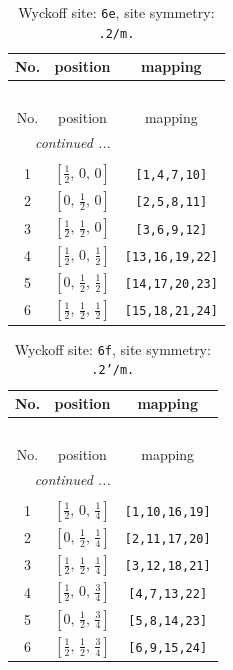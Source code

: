 \documentclass[fleqn,8pt]{jsarticle}
\begin{document}
\renewcommand{\arraystretch}{1.2}
\begin{longtable}{ccc}
\caption{Wyckoff site: {\tt 6e}, site symmetry: {\tt .2/m.}}
 \\
 \hline \hline
No. & position & mapping \\ \hline \endfirsthead

\multicolumn{2}{l}{\tablename\ \thetable{}} \\
 \hline \hline
No. & position & mapping \\ \hline \endhead

 \hline \hline
\multicolumn{2}{r}{\footnotesize\it continued ...} \\ \endfoot

 \hline \hline
\multicolumn{2}{r}{} \\ \endlastfoot

1 & $\left[ \frac{1}{2},\, 0,\, 0 \right]$ & {\tt [1,4,7,10]} \\ \hline
2 & $\left[ 0,\, \frac{1}{2},\, 0 \right]$ & {\tt [2,5,8,11]} \\ \hline
3 & $\left[ \frac{1}{2},\, \frac{1}{2},\, 0 \right]$ & {\tt [3,6,9,12]} \\ \hline
4 & $\left[ \frac{1}{2},\, 0,\, \frac{1}{2} \right]$ & {\tt [13,16,19,22]} \\ \hline
5 & $\left[ 0,\, \frac{1}{2},\, \frac{1}{2} \right]$ & {\tt [14,17,20,23]} \\ \hline
6 & $\left[ \frac{1}{2},\, \frac{1}{2},\, \frac{1}{2} \right]$ & {\tt [15,18,21,24]} \\
\end{longtable}
\renewcommand{\arraystretch}{1.2}
\begin{longtable}{ccc}
\caption{Wyckoff site: {\tt 6f}, site symmetry: {\tt .2'/m.}}
 \\
 \hline \hline
No. & position & mapping \\ \hline \endfirsthead

\multicolumn{2}{l}{\tablename\ \thetable{}} \\
 \hline \hline
No. & position & mapping \\ \hline \endhead

 \hline \hline
\multicolumn{2}{r}{\footnotesize\it continued ...} \\ \endfoot

 \hline \hline
\multicolumn{2}{r}{} \\ \endlastfoot

1 & $\left[ \frac{1}{2},\, 0,\, \frac{1}{4} \right]$ & {\tt [1,10,16,19]} \\ \hline
2 & $\left[ 0,\, \frac{1}{2},\, \frac{1}{4} \right]$ & {\tt [2,11,17,20]} \\ \hline
3 & $\left[ \frac{1}{2},\, \frac{1}{2},\, \frac{1}{4} \right]$ & {\tt [3,12,18,21]} \\ \hline
4 & $\left[ \frac{1}{2},\, 0,\, \frac{3}{4} \right]$ & {\tt [4,7,13,22]} \\ \hline
5 & $\left[ 0,\, \frac{1}{2},\, \frac{3}{4} \right]$ & {\tt [5,8,14,23]} \\ \hline
6 & $\left[ \frac{1}{2},\, \frac{1}{2},\, \frac{3}{4} \right]$ & {\tt [6,9,15,24]} \\
\end{longtable}
\end{document}
